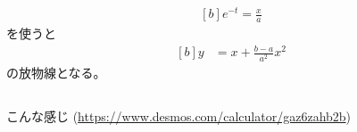 \documentclass[../ap_2017.tex]{subfiles}
\begin{document}
\subsection{}
\begin{equation}\begin{aligned}[b]
    e^{-t} = \frac{x}{a}
\end{aligned}\end{equation}
を使うと
\begin{equation*}\begin{aligned}[b]
    y &= x + \frac{b-a}{a^2}x^2
\end{aligned}\end{equation*}
の放物線となる。

\subsection{}
こんな感じ
(\url{https://www.desmos.com/calculator/gaz6zahb2b})
\end{document}
